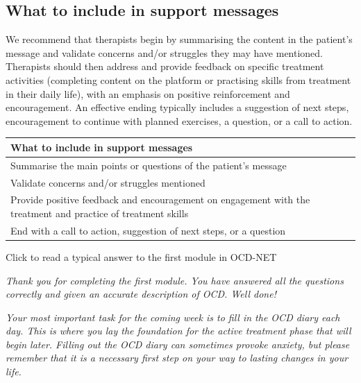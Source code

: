 \documentclass[]{book}
\begin{document}
\hypertarget{what-to-include-in-support-messages}{%
\subsection{What to include in support messages}\label{what-to-include-in-support-messages}}

We recommend that therapists begin by summarising the content in the patient's message and validate concerns and/or struggles they may have mentioned. Therapists should then address and provide feedback on specific treatment activities (completing content on the platform or practising skills from treatment in their daily life), with an emphasis on positive reinforcement and encouragement. An effective ending typically includes a suggestion of next steps, encouragement to continue with planned exercises, a question, or a call to action.

\begin{longtable}[]{@{}l@{}}
\toprule
\begin{minipage}[b]{0.97\columnwidth}\raggedright
\textbf{What to include in support messages}\strut
\end{minipage}\tabularnewline
\midrule
\endhead
\begin{minipage}[t]{0.97\columnwidth}\raggedright
Summarise the main points or questions of the patient's message\strut
\end{minipage}\tabularnewline
\begin{minipage}[t]{0.97\columnwidth}\raggedright
Validate concerns and/or struggles mentioned\strut
\end{minipage}\tabularnewline
\begin{minipage}[t]{0.97\columnwidth}\raggedright
Provide positive feedback and encouragement on engagement with the treatment and practice of treatment skills\strut
\end{minipage}\tabularnewline
\begin{minipage}[t]{0.97\columnwidth}\raggedright
End with a call to action, suggestion of next steps, or a question\strut
\end{minipage}\tabularnewline
\bottomrule
\end{longtable}

 Click to read a typical answer to the first module in OCD-NET

\emph{Thank you for completing the first module. You have answered all the questions correctly and given an accurate description of OCD. Well done!}

\emph{Your most important task for the coming week is to fill in the OCD diary each day. This is where you lay the foundation for the active treatment phase that will begin later. Filling out the OCD diary can sometimes provoke anxiety, but please remember that it is a necessary first step on your way to lasting changes in your life.}
\end{document}
